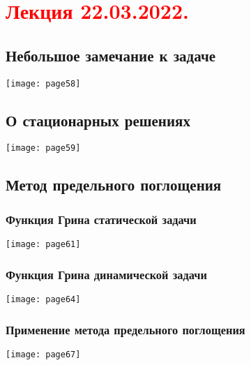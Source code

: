 \documentclass[main.tex]{subfiles}
\begin{document}
\section{\textcolor{red}{Лекция 22.03.2022.}}

\subsection{Небольшое замечание к задаче}
\texttt{[image: page58]}

\subsection{О стационарных решениях}
\texttt{[image: page59]}


\subsection{Метод предельного поглощения}
\subsubsection{Функция Грина статической задачи}
\texttt{[image: page61]}



\subsubsection{Функция Грина динамической задачи}
\texttt{[image: page64]}



\subsubsection{Применение метода предельного поглощения}
\texttt{[image: page67]}



\end{document}
